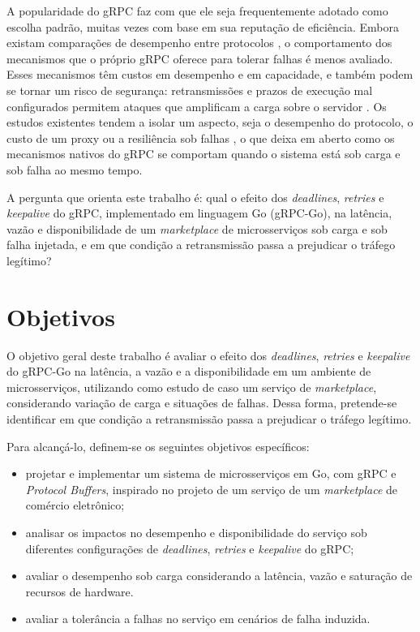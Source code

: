 A popularidade do gRPC faz com que ele seja frequentemente adotado como escolha padrão, muitas
vezes com base em sua reputação de eficiência. Embora existam comparações de desempenho entre
protocolos \cite{PerformanceEvaluation:2024}, o comportamento dos mecanismos que o próprio gRPC
oferece para tolerar falhas é menos avaliado. Esses mecanismos têm custos em desempenho e em
capacidade, e também podem se tornar um risco de segurança: retransmissões e prazos de execução mal
configurados permitem ataques que amplificam a carga sobre o servidor \cite{Retry-Experiment:2023}. Os
estudos existentes tendem a isolar um aspecto, seja o desempenho do protocolo, o custo de um proxy
\cite{LoadBalancer-Evaluation:2022, RethinkingRPC:2025} ou a resiliência sob falhas
\cite{ResilienceBench-Operator:2025}, o que deixa em aberto como os mecanismos nativos do gRPC se
comportam quando o sistema está sob carga e sob falha ao mesmo tempo.

A pergunta que orienta este trabalho é: qual o efeito dos \textit{deadlines}, \textit{retries} e
\textit{keepalive} do gRPC, implementado em linguagem Go (gRPC-Go), na latência, vazão e
disponibilidade de um \textit{marketplace} de microsserviços sob carga e sob falha injetada, e em
que condição a retransmissão passa a prejudicar o tráfego legítimo?

\section{Objetivos}

O objetivo geral deste trabalho é avaliar o efeito dos \textit{deadlines}, \textit{retries} e
\textit{keepalive} do gRPC-Go na latência, a vazão e a disponibilidade em um ambiente de
microsserviços, utilizando como estudo de caso um serviço de \textit{marketplace}, considerando variação de
carga e situações de falhas. Dessa forma, pretende-se identificar em que condição a retransmissão
passa a prejudicar o tráfego legítimo.


Para alcançá-lo, definem-se os seguintes objetivos específicos:

\begin{itemize}
  \item projetar e implementar um sistema de microsserviços em Go, com gRPC e \textit{Protocol
    Buffers}, inspirado no projeto de um serviço de um \textit{marketplace} de comércio eletrônico;
  \item analisar os impactos no desempenho e disponibilidade  do serviço sob diferentes
    configurações de \textit{deadlines}, \textit{retries} e \textit{keepalive} do gRPC;
  \item avaliar o desempenho sob carga considerando a latência, vazão e saturação de recursos de hardware.
  \item avaliar a tolerância a falhas no serviço em cenários de falha induzida.
\end{itemize}

